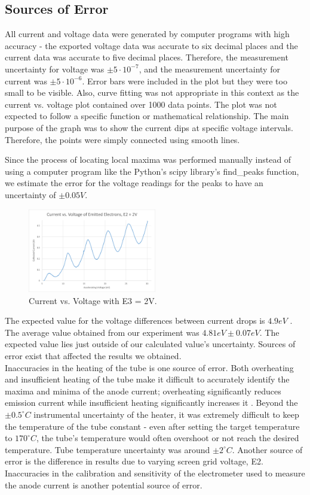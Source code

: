 \documentclass[12pt,twocolumn,letterpaper]{article}
\begin{document}
\subsection{Sources of Error} \label{error}
All current and voltage data were generated by computer programs with high accuracy - the exported voltage data was accurate to six decimal places and the current data was accurate to five decimal places. Therefore, the measurement uncertainty for voltage was $\pm 5\cdot10^{-7}$, and the measurement uncertainty for current was $\pm 5\cdot10^{-6}$. Error bars were included in the plot but they were too small to be visible. Also, curve fitting was not appropriate in this context as the current vs. voltage plot contained over 1000 data points. The plot was not expected to follow a specific function or mathematical relationship. The main purpose of the graph was to show the current dips at specific voltage intervals. Therefore, the points were simply connected using smooth lines.

Since the process of locating local maxima was performed manually instead of using a computer program like the Python's scipy library's find\_peaks function, we estimate the error for the voltage readings for the peaks to have an uncertainty of $\pm 0.05 V$.

\begin{figure}
  \centering
  \includegraphics[width=0.5\textwidth]{figures/I vs A 2V.png}
  \caption{Current vs. Voltage with E3 = 2V.}
  \label{2V}
\end{figure}

The expected value for the voltage differences between current drops is $4.9 eV$ \cite{franckhertzedu}. The average value obtained from our experiment was $4.81eV \pm 0.07 eV$. The expected value lies just outside of our calculated value's uncertainty. Sources of error exist that affected the results we obtained. 
\\
Inaccuracies in the heating of the tube is one source of error. Both overheating and insufficient heating of the tube make it difficult to accurately identify the maxima and minima of the anode current; overheating significantly reduces emission current while insufficient heating significantly increases it \cite{labmanual}. Beyond the $\pm 0.5^\circ C$ instrumental uncertainty of the heater, it was extremely difficult to keep the temperature of the tube constant - even after setting the target temperature to $170^\circ C$, the tube's temperature would often overshoot or not reach the desired temperature. Tube temperature uncertainty was around $\pm 2^\circ C$. Another source of error is the difference in results due to varying screen grid voltage, E2. Inaccuracies in the calibration and sensitivity of the electrometer used to measure the anode current is another potential source of error.
\end{document}

